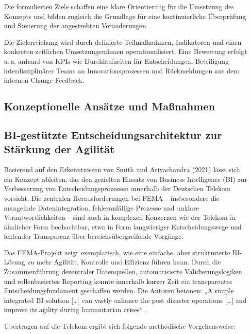 \documentclass[12pt,a4paper]{article}
\begin{document}
\noindent Die formulierten Ziele schaffen eine klare Orientierung für die Umsetzung des Konzepts und bilden zugleich die Grundlage für eine kontinuierliche Überprüfung und Steuerung der angestrebten Veränderungen.

\noindent Die Zielerreichung wird durch definierte Teilmaßnahmen, Indikatoren und einen konkreten zeitlichen Umsetzungsrahmen operationalisiert. Eine Bewertung erfolgt u.\,a. anhand von KPIs wie Durchlaufzeiten für Entscheidungen, Beteiligung interdisziplinärer Teams an Innovationsprozessen und Rückmeldungen aus dem internen Change-Feedback.


	\subsection{Konzeptionelle Ansätze und Maßnahmen}
	
	\subsection{BI-gestützte Entscheidungsarchitektur zur Stärkung der Agilität}
	
	Basierend auf den Erkenntnissen von Smith und Ariyachandra (2021) lässt sich ein Konzept ableiten, das den gezielten Einsatz von Business Intelligence (BI) zur Verbesserung von Entscheidungsprozessen innerhalb der Deutschen Telekom vorsieht. Die zentralen Herausforderungen bei FEMA – insbesondere die mangelnde Datenintegration, fehleranfällige Prozesse und unklare Verantwortlichkeiten – sind auch in komplexen Konzernen wie der Telekom in ähnlicher Form beobachtbar, etwa in Form langwieriger Entscheidungswege und fehlender Transparenz über bereichsübergreifende Vorgänge.
	
	Das FEMA-Projekt zeigt exemplarisch, wie eine einfache, aber strukturierte BI-Lösung zu mehr Agilität, Kontrolle und Effizienz führen kann. Durch die Zusammenführung dezentraler Datenquellen, automatisierte Validierungslogiken und rollenbasiertes Reporting konnte innerhalb kurzer Zeit ein transparentes Entscheidungsfundament geschaffen werden. Die Autoren betonen: „A simple integrated BI solution […] can vastly enhance the post disaster operations […] and improve its agility during humanitarian crises“ \parencite[S.~210]{smithAriyachandra2021}.
	
	Übertragen auf die Telekom ergibt sich folgende methodische Vorgehensweise:
	
\end{document}
